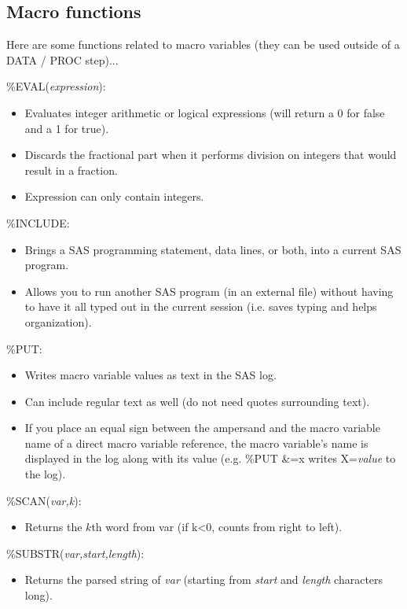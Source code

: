\documentclass[11pt, oneside]{article}
\begin{document}


\subsection{Macro functions}

Here are some functions related to macro variables (they can be used outside of a DATA / PROC step)...

\%EVAL(\textit{expression}):
\begin{itemize}
\item Evaluates integer arithmetic or logical expressions (will return a 0 for false and a 1 for true).
\item Discards the fractional part when it performs division on integers that would result in a fraction.
\item Expression can only contain integers.
\end{itemize}

\%INCLUDE:
\begin{itemize}
\item Brings a SAS programming statement, data lines, or both, into a current SAS program.
\item Allows you to run another SAS program (in an external file) without having to have it all typed out in the current session (i.e. saves typing and helps organization).
\end{itemize}

\%PUT:
\begin{itemize}
\item Writes macro variable values as text in the SAS log.
\item Can include regular text as well (do not need quotes surrounding text).
\item If you place an equal sign between the ampersand and the macro variable name of a direct macro variable reference, the macro variable's name is displayed in the log along with its value (e.g. \%PUT \&=x writes X=\textit{value} to the log).
\end{itemize}

\%SCAN(\textit{var,k}):
\begin{itemize}
\item Returns the $k$th word from var (if k<0, counts from right to left).
\end{itemize}

\%SUBSTR(\textit{var,start,length}):
\begin{itemize}
\item Returns the parsed string of \textit{var} (starting from \textit{start} and \textit{length} characters long).
\end{itemize}
\end{document}
